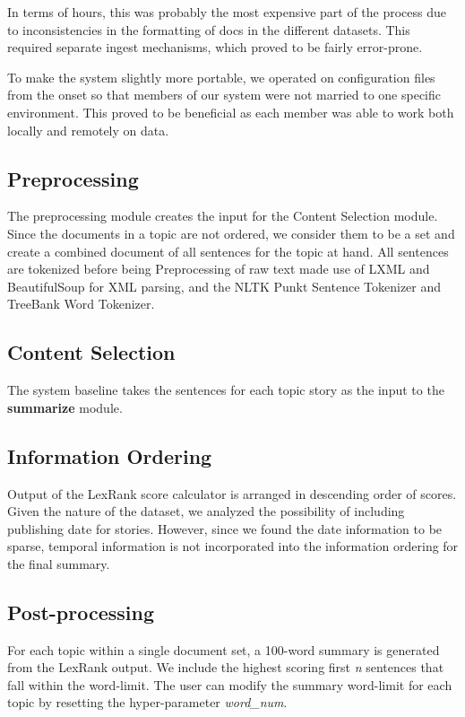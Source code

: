 \documentclass[11pt]{article}
\begin{document}
In terms of hours, this was probably the most expensive part of the process due to inconsistencies in the formatting of docs in the different datasets. This required separate ingest mechanisms, which proved to be fairly error-prone. 

To make the system slightly more portable, we operated on configuration files from the onset so that members of our system were not married to one specific environment. This proved to be beneficial as each member was able to work both locally and remotely on data. 

\subsection{Preprocessing}
The preprocessing module creates the input for the Content Selection module. Since the documents in a topic are not ordered, we consider them to be a set and create a combined document of all sentences for the topic at hand. All sentences are tokenized before being 
Preprocessing of raw text made use of LXML and BeautifulSoup for XML parsing, and the NLTK Punkt Sentence Tokenizer and TreeBank Word Tokenizer. 


\subsection{Content Selection}
The system baseline takes the sentences for each topic story as the input to the \textbf{summarize} module. 

\subsection{Information Ordering} 
Output of the LexRank score calculator is arranged in descending order of scores. Given the nature of the dataset, we analyzed the possibility of including publishing date for stories. However, since we found the date information to be sparse, temporal information is not incorporated into the information ordering for the final summary.


\subsection{Post-processing}
For each topic within a single document set, a 100-word summary is generated from the LexRank output. We include the highest scoring first \textit{n} sentences that fall within the word-limit. The user can modify the summary word-limit for each topic by resetting the hyper-parameter \textit{word\_num}. 
\end{document}
